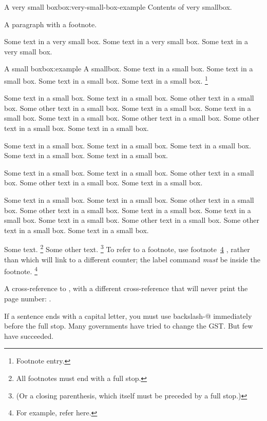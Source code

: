\documentclass{grattan}
\begin{document}
\clearpage

\begin{verysmallbox}{A very small box}{box:very-small-box-example}
Contents of very smallbox.

A paragraph with a footnote.

Some text in a very small box. 
Some text in a very small box. 
Some text in a very small box. 
\end{verysmallbox}

\begin{smallbox}{A small box}{box:example}
A smallbox. 
Some text in a small box. 
Some text in a small box. 
Some text in a small box. 
Some text in a small box.%
\footnote{Footnote entry.}


Some text in a small box. 
Some text in a small box. 
Some other text in a small box. 
Some other text in a small box. 
Some text in a small box. 
Some text in a small box. 
Some text in a small box. 
Some other text in a small box. 
Some other text in a small box. 
Some text in a small box. 


Some text in a small box. 
Some text in a small box. 
Some text in a small box. 
Some text in a small box. 
Some text in a small box.

Some text in a small box. 
Some text in a small box. 
Some other text in a small box. 
Some other text in a small box. 
Some text in a small box. 

Some text in a small box. 
Some text in a small box. 
Some other text in a small box. 
Some other text in a small box. 
Some text in a small box. 
Some text in a small box. 
Some text in a small box. 
Some other text in a small box. 
Some other text in a small box. 
Some text in a small box. 

Some text.%
\footnote{All footnotes must end with a full stop.} 
Some other text.%
\footnote{(Or a closing parenthesis, which itself must be preceded by a full stop.)}
To refer to a footnote, use footnote~\ref{fn:example} , rather than  which will link to a different counter; 
the label command \emph{must} be inside the footnote.%
\footnote{\label{fn:example}For example, refer here.}
\end{smallbox}

A cross-reference to , with a different cross-reference that will never print the page number: .

\label{paragraph:sentence-ending-periods}
If a sentence ends with a capital letter, you must use backslash-@ immediately before the full stop.
Many governments have tried to change the GST\@. 
But few have succeeded.
\end{document}
